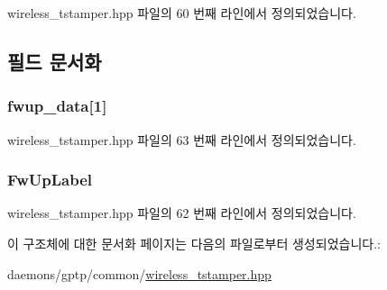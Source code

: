 wireless\+\_\+tstamper.\+hpp 파일의 60 번째 라인에서 정의되었습니다.



\subsection{필드 문서화}
\subsubsection[{\texorpdfstring{fwup\+\_\+data}{fwup_data}}]{ fwup\+\_\+data\mbox{[}1\mbox{]}}\hypertarget{struct___p_t_p___s_p_e_c_a0e5998c608808bb76c34bb25fa6c0da2}{}\label{struct___p_t_p___s_p_e_c_a0e5998c608808bb76c34bb25fa6c0da2}


wireless\+\_\+tstamper.\+hpp 파일의 63 번째 라인에서 정의되었습니다.

\subsubsection[{\texorpdfstring{Fw\+Up\+Label}{FwUpLabel}}]{ Fw\+Up\+Label}\hypertarget{struct___p_t_p___s_p_e_c_a3180b75542044fab6e7b486623f9e8b9}{}\label{struct___p_t_p___s_p_e_c_a3180b75542044fab6e7b486623f9e8b9}


wireless\+\_\+tstamper.\+hpp 파일의 62 번째 라인에서 정의되었습니다.



이 구조체에 대한 문서화 페이지는 다음의 파일로부터 생성되었습니다.\+:\begin{DoxyCompactItemize}
\item 
daemons/gptp/common/\hyperlink{wireless__tstamper_8hpp}{wireless\+\_\+tstamper.\+hpp}\end{DoxyCompactItemize}
